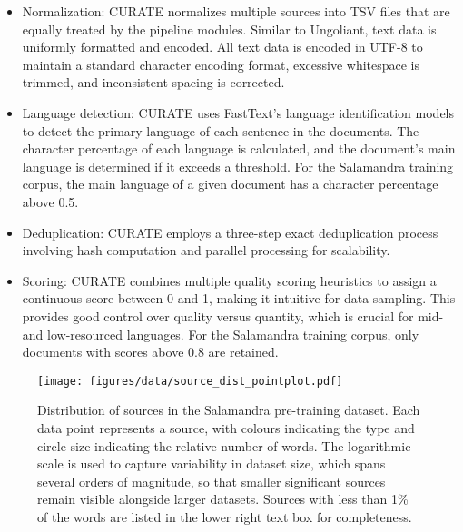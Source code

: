\begin{itemize}
    \item Normalization: CURATE normalizes multiple sources into TSV files that are equally treated by the pipeline modules. Similar to Ungoliant, text data is uniformly formatted and encoded. All text data is encoded in UTF-8 to maintain a standard character encoding format, excessive whitespace is trimmed, and inconsistent spacing is corrected.
    \item Language detection: CURATE uses FastText's language identification models to detect the primary language of each sentence in the documents. The character percentage of each language is calculated, and the document's main language is determined if it exceeds a threshold. For the Salamandra training corpus, the main language of a given document has a character percentage above 0.5.
    \item Deduplication: CURATE employs a three-step exact deduplication process involving hash computation and parallel processing for scalability. %
    \item Scoring: CURATE combines multiple quality scoring heuristics to assign a continuous score between 0 and 1, making it intuitive for data sampling. This provides good control over quality versus quantity, which is crucial for mid- and low-resourced languages. For the Salamandra training corpus, only documents with scores above 0.8 are retained.
\end{itemize}

\begin{figure}[htbp!]
    \texttt{[image: figures/data/source\_dist\_pointplot.pdf]}
    \caption{Distribution of sources in the Salamandra pre-training dataset. Each data point represents a source, with colours indicating the type and circle size indicating the relative number of words. The logarithmic scale is used to capture variability in dataset size, which spans several orders of magnitude, so that smaller significant sources remain visible alongside larger datasets. Sources with less than 1\% of the words are listed in the lower right text box for completeness.}
    \label{fig:source_dist}
\end{figure}

